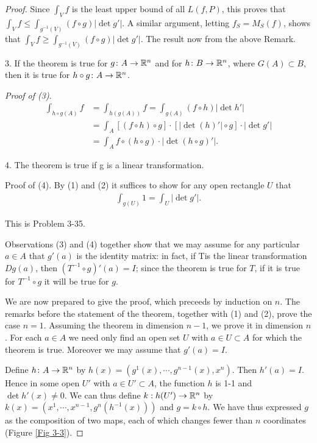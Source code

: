 \begin{proof}
Since $\int_V f$ is the least upper bound of all $L(f,P)$, this proves that 
$\int_V f \le \int_{g^{-1}(V)} (f\circ g)|\det g'|$. A similar argument, letting 
$f_S = M_S(f)$, shows that $\int_V f \ge \int_{g^{-1}(V)} (f\circ g)|\det g'|$. The result 
now from the above Remark.

3. If the theorem is true for $g\colon{}A\to \mathbb{R}^n$ and for $h\colon{}B\to \mathbb{R}^n$, where 
$G(A)\subset B$, then it is true for $h\circ g\colon{}A\to \mathbb{R}^n$.

\textit{Proof of (3)}. 
\begin{align*}
    \int_{h\circ g(A)} f 
    & = \int_{h(g(A))} f 
        = \int_{g(A)} (f\circ h)|\det h'| \\
    & = \int_A [(f\circ h)\circ g] \cdot [|\det (h)'|\circ g]\cdot |\det g'| \\
    & = \int_A f\circ (h\circ g) \cdot |\det (h\circ g)'|.
\end{align*}

4. The theorem is true if g is a linear transformation.\par
Proof of (4). By (1) and (2) it suffices to show for any open
rectangle $U$ that
\begin{align*}
  \int_{g(U)} 1 = \int_U |\det g'|.
\end{align*}

This is Problem 3-35.

Observations (3) and (4) together show that we may assume
for any particular $a \in A$ that $g'(a)$ is the identity matrix: in
fact, if Tis the linear transformation $Dg(a)$, then $(T^{-1}\circ g)'(a)=I$;
since the theorem is true for $T$, if it is true for $T^{-1}\circ g$ it will
be true for $g$.

We are now prepared to give the proof, which preceeds by
induction on $n$. The remarks before the statement of the
theorem, together with (1) and (2), prove the case $n = 1$.
Assuming the theorem in dimension $n-1$, we prove it in
dimension $n$. For each $a\in A$ we need only find an open set
$U$ with $a\in U \subset A$ for which the theorem is true.
Moreover we may assume that $g'(a)=I$. 

Define $h\colon{}A\to \mathbb{R}^n$ by $h(x) = (g^1(x), \cdots, g^{n-1}(x), x^n)$. Then $h'(a)=I$. Hence 
in some open $U'$ with $a\in U'\subset A$, the function $h$ is 1-1 and $\det h'(x)\neq 0$. We 
can thus define $k: h(U')\to \mathbb{R}^n$ by $k(x)=(x^1, \cdots, x^{n-1}, g^n(h^{-1}(x)))$ and 
$g=k\circ h$. We have thus expressed $g$ as the composition of two maps, each of which changes
fewer than $n$ coordinates (Figure \ref{Fig 3-3}).


\end{proof}
